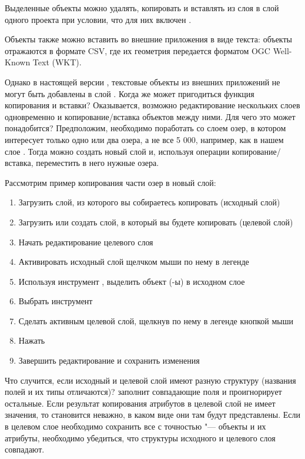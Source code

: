 Выделенные объекты можно удалять, копировать и вставлять из слоя в слой
одного проекта \qg  при условии, что для них включен
.

Объекты также можно вставить во внешние приложения в виде текста: объекты
отражаются в формате  CSV, где их геометрия передается форматом
OGC Well-Known Text (WKT).

Однако в настоящей версии  \qg, текстовые объекты из внешних приложений
\qg не могут быть добавлены в слой \qg. Когда же может пригодиться функция
копирования и вставки? Оказывается, возможно редактирование нескольких
слоев одновременно и копирование/вставка объектов между ними. Для чего это
может понадобится? Предположим, необходимо поработать со слоем озер, в
котором интересует только одно или два озера, а не все 5 000, например,
как в нашем слое . Тогда можно создать новый слой и,
используя операции копирование/вставка, переместить в него нужные озера.

Рассмотрим пример копирования части озер в новый слой:

\begin{enumerate}
\item Загрузить слой, из которого вы собираетесь копировать (исходный слой)
\item Загрузить или создать слой, в который вы будете копировать (целевой слой)
\item Начать редактирование целевого слоя
\item Активировать исходный слой щелчком мыши по нему в легенде
\item Используя инструмент ,
выделить объект (-ы) в исходном слое
\item Выбрать инструмент  
\item Сделать активным целевой слой, щелкнув по нему в легенде кнопкой мыши
\item Нажать 
\item Завершить редактирование и сохранить изменения
\end{enumerate}

Что случится, если исходный и целевой слой имеют разную структуру (названия
полей и их типы отличаются)? \qg заполнит совпадающие поля и проигнорирует
остальные. Если результат копирования атрибутов в целевой слой не имеет
значения, то становится неважно, в каком виде они там будут представлены.
Если в целевом слое необходимо сохранить все с точностью "--- объекты и
их атрибуты, необходимо убедиться, что структуры исходного и целевого слоя
совпадают.


